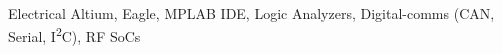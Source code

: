 

\begin{cvskills}

  \cvskill%
    {Electrical} 
    {Altium, Eagle, MPLAB IDE, Logic Analyzers, 
    Digital-comms (CAN, Serial, I\textsuperscript{2}C), RF SoCs}%


\end{cvskills}
